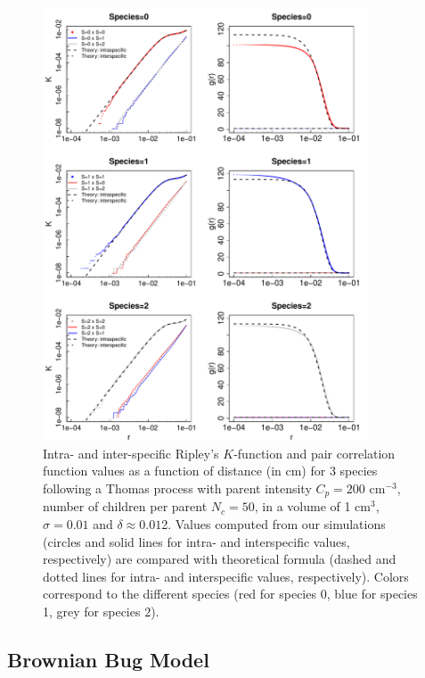 \documentclass[english]{article}
\begin{document}
\begin{figure}[H]
\begin{centering}
\includegraphics[width=0.86\textwidth]{../code/figure/K_PCF_Thomas}
\par\end{centering}
\caption{Intra- and inter-specific Ripley's $K$-function and pair correlation
function values as a function of distance (in cm) for 3 species following
a Thomas process with parent intensity $C_{p}=200$ cm$^{-3}$, number
of children per parent $N_{c}=50$, in a volume of 1 cm$^{3}$, $\sigma=0.01$
and $\delta\approx0.01$2. Values computed from our simulations (circles
and solid lines for intra- and interspecific values, respectively)
are compared with theoretical formula (dashed and dotted lines for
intra- and interspecific values, respectively). Colors correspond
to the different species (red for species 0, blue for species 1, grey
for species 2). }
\end{figure}

\subsection{Brownian Bug Model}
\end{document}
